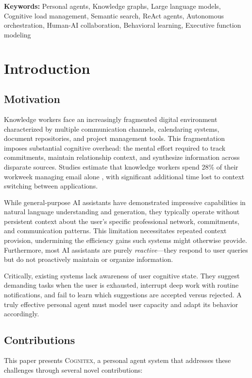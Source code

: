 \documentclass[11pt,a4paper]{article}
\newcommand{\cognitex}{\textsc{Cognitex}}
\begin{document}
\noindent\textbf{Keywords:} Personal agents, Knowledge graphs, Large language models, Cognitive load management, Semantic search, ReAct agents, Autonomous orchestration, Human-AI collaboration, Behavioral learning, Executive function modeling

\section{Introduction}

\subsection{Motivation}

Knowledge workers face an increasingly fragmented digital environment characterized by multiple communication channels, calendaring systems, document repositories, and project management tools. This fragmentation imposes substantial cognitive overhead: the mental effort required to track commitments, maintain relationship context, and synthesize information across disparate sources. Studies estimate that knowledge workers spend 28\% of their workweek managing email alone \citep{mckinsey2012social}, with significant additional time lost to context switching between applications.

While general-purpose AI assistants have demonstrated impressive capabilities in natural language understanding and generation, they typically operate without persistent context about the user's specific professional network, commitments, and communication patterns. This limitation necessitates repeated context provision, undermining the efficiency gains such systems might otherwise provide. Furthermore, most AI assistants are purely \emph{reactive}---they respond to user queries but do not proactively maintain or organize information.

Critically, existing systems lack awareness of user cognitive state. They suggest demanding tasks when the user is exhausted, interrupt deep work with routine notifications, and fail to learn which suggestions are accepted versus rejected. A truly effective personal agent must model user capacity and adapt its behavior accordingly.

\subsection{Contributions}

This paper presents \cognitex{}, a personal agent system that addresses these challenges through several novel contributions:
\end{document}
